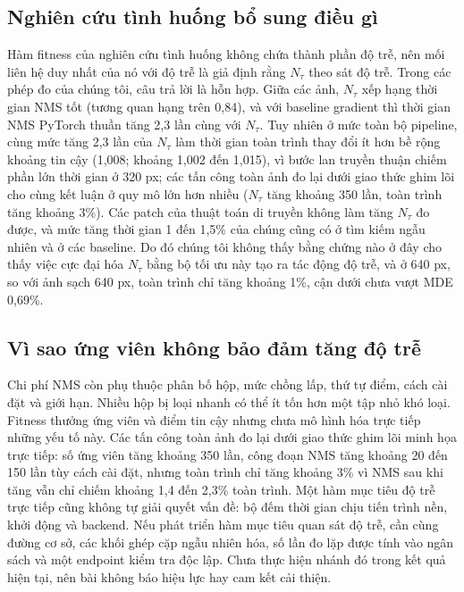 \documentclass[a4paper,fleqn]{cas-dc}
\newcommand{\Ntau}{N_{\tau}}
\begin{document}
\subsection{Nghiên cứu tình huống bổ sung điều gì}
Hàm fitness của nghiên cứu tình huống không chứa thành phần độ trễ, nên mối liên hệ duy nhất của nó với độ trễ là giả định rằng $\Ntau$ theo sát độ trễ. Trong các phép đo của chúng tôi, câu trả lời là hỗn hợp. Giữa các ảnh, $\Ntau$ xếp hạng thời gian NMS tốt (tương quan hạng trên 0,84), và với baseline gradient thì thời gian NMS PyTorch thuần tăng 2,3 lần cùng với $\Ntau$. Tuy nhiên ở mức toàn bộ pipeline, cùng mức tăng 2,3 lần của $\Ntau$ làm thời gian toàn trình thay đổi ít hơn bề rộng khoảng tin cậy (1,008; khoảng 1,002 đến 1,015), vì bước lan truyền thuận chiếm phần lớn thời gian ở 320 px; các tấn công toàn ảnh đo lại dưới giao thức ghim lõi cho cùng kết luận ở quy mô lớn hơn nhiều ($\Ntau$ tăng khoảng 350 lần, toàn trình tăng khoảng 3\%). Các patch của thuật toán di truyền không làm tăng $\Ntau$ đo được, và mức tăng thời gian 1 đến 1,5\% của chúng cũng có ở tìm kiếm ngẫu nhiên và ở các baseline. Do đó chúng tôi không thấy bằng chứng nào ở đây cho thấy việc cực đại hóa $\Ntau$ bằng bộ tối ưu này tạo ra tác động độ trễ, và ở 640 px, so với ảnh sạch 640 px, toàn trình chỉ tăng khoảng 1\%, cận dưới chưa vượt MDE 0,69\%.

\subsection{Vì sao ứng viên không bảo đảm tăng độ trễ}
Chi phí NMS còn phụ thuộc phân bố hộp, mức chồng lấp, thứ tự điểm, cách cài đặt và giới hạn. Nhiều hộp bị loại nhanh có thể ít tốn hơn một tập nhỏ khó loại. Fitness thưởng ứng viên và điểm tin cậy nhưng chưa mô hình hóa trực tiếp những yếu tố này. Các tấn công toàn ảnh đo lại dưới giao thức ghim lõi minh họa trực tiếp: số ứng viên tăng khoảng 350 lần, công đoạn NMS tăng khoảng 20 đến 150 lần tùy cách cài đặt, nhưng toàn trình chỉ tăng khoảng 3\% vì NMS sau khi tăng vẫn chỉ chiếm khoảng 1,4 đến 2,3\% toàn trình. Một hàm mục tiêu độ trễ trực tiếp cũng không tự giải quyết vấn đề: bộ đếm thời gian chịu tiến trình nền, khởi động và backend. Nếu phát triển hàm mục tiêu quan sát độ trễ, cần cùng đường cơ sở, các khối ghép cặp ngẫu nhiên hóa, số lần đo lặp được tính vào ngân sách và một endpoint kiểm tra độc lập. Chưa thực hiện nhánh đó trong kết quả hiện tại, nên bài không báo hiệu lực hay cam kết cải thiện.
\end{document}
